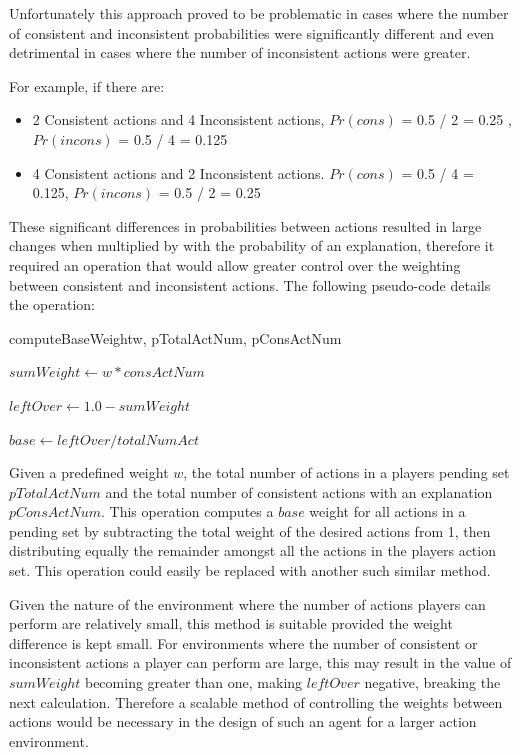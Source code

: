 \documentclass[parskip]{cs4rep}
\begin{document}
Unfortunately this approach proved to be problematic in cases where the number of consistent and inconsistent probabilities were significantly different and even detrimental in cases where the number of inconsistent actions were greater. 

For example, if there are:

\begin{itemize}
\item
2 Consistent actions and 4 Inconsistent actions, $Pr(cons)$ = 0.5 / 2 = 0.25 , $Pr(incons)$ = 0.5 / 4 = 0.125 
\item
4 Consistent actions and 2 Inconsistent actions. $Pr(cons)$ = 0.5 / 4 = 0.125, $Pr(incons)$ = 0.5 / 2 = 0.25
\end{itemize}

These significant differences in probabilities between actions resulted in large changes when multiplied by with the probability of an explanation, therefore it required an operation that would allow greater control over the weighting between consistent and inconsistent actions. The following pseudo-code details the operation:

\begin{pseudocode}[ruled]{computeBaseWeight}{w, pTotalActNum, pConsActNum}
\begin{algorithm}[H]

$sumWeight \gets w * consActNum$

$leftOver \gets 1.0 - sumWeight$

$base \gets leftOver / totalNumAct$

\end{algorithm}
\end{pseudocode}

Given a predefined weight $w$, the total number of actions in a players pending set $pTotalActNum$ and the total number of consistent actions with an explanation $pConsActNum$. This operation computes a $base$ weight for all actions in a pending set by subtracting the total weight of the desired actions from 1, then distributing equally the remainder amongst all the actions in the players action set. This operation could easily be replaced with another such similar method.

Given the nature of the environment where the number of actions players can perform are relatively small, this method is suitable provided the weight difference is kept small. For environments where the number of consistent or inconsistent actions a player can perform are large, this may result in the value of $sumWeight$ becoming greater than one, making $leftOver$ negative, breaking the next calculation. Therefore a scalable method of controlling the weights between actions would be necessary in the design of such an agent for a larger action environment.
\end{document}
